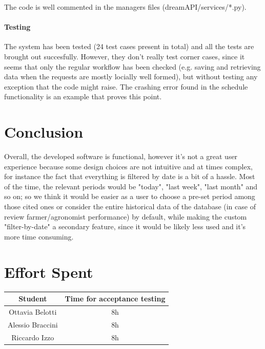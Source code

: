 \documentclass[table, 12pt]{article}
\begin{document}
The code is well commented in the managers files (dreamAPI/services/*.py).

\paragraph{Testing}
The system has been tested (24 test cases present in total) and all the tests are brought out succesfully. However, they don't really test corner cases, since it seems that only the regular workflow has been checked (e.g. saving and retrieving data when the requests are mostly locially well formed), but without testing any exception that the code might raise. The crashing error found in the schedule functionality is an example that proves this point.

\section{Conclusion}
Overall, the developed software is functional, however it's not a great user experience because some design choices are not intuitive and at times complex, for instance the fact that everything is filtered by date is a bit of a hassle. Most of the time, the relevant periods would be "today", "last week", "last month" and so on; so we think it would be easier as a user to choose a pre-set period among those cited ones or consider the entire historical data of the database (in case of review farmer/agronomist performance) by default, while making the custom "filter-by-date" a secondary feature, since it would be likely less used and it's more time consuming. 



\section{Effort Spent}
\begin{tabular}{|c||c|}
    \hline
    Student & Time for acceptance testing\\ \hline
    Ottavia Belotti & 8h \\
    Alessio Braccini & 8h\\
    Riccardo Izzo & 8h \\
    \hline
\end{tabular}
\end{document}
